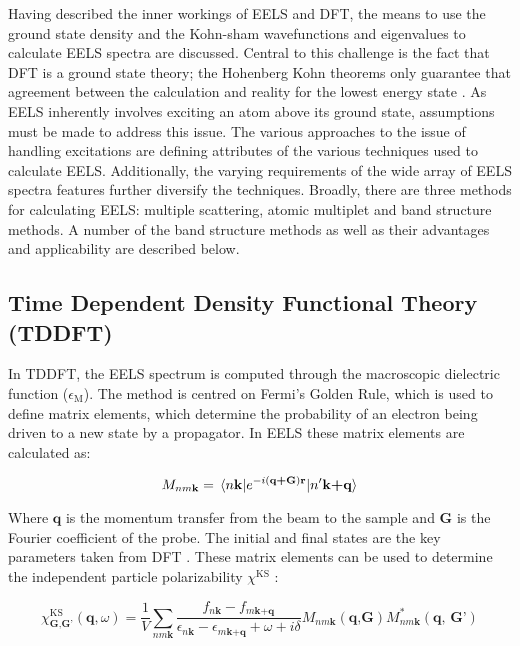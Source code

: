 
Having described the inner workings of EELS and DFT, the means to use the ground state density and the Kohn-sham wavefunctions and eigenvalues to calculate EELS spectra are discussed.  Central to this challenge is the fact that DFT is a ground state theory; the Hohenberg Kohn theorems only guarantee that agreement between the calculation and reality for the lowest energy state \cite{hohenberg_inhomogeneous_1964}. As EELS inherently involves exciting an atom above its ground state, assumptions must be made to address this issue. The various approaches to the issue of handling excitations are defining attributes of the various techniques used to calculate EELS.  Additionally, the varying requirements of the wide array of EELS spectra features further diversify the techniques. Broadly, there are three methods for calculating EELS: multiple scattering, atomic multiplet and band structure methods.  A number of the band structure methods as well as their advantages and applicability are described below.


\subsection{Time Dependent Density Functional Theory (TDDFT)}
In TDDFT, the EELS spectrum is computed through the macroscopic dielectric function ($\epsilon_{\mathrm{M}}$). The method is centred on Fermi's Golden Rule, which is used to define matrix elements, which determine the probability of an electron being driven to a new state by a propagator.  In EELS these matrix elements are calculated as:

\begin{equation}
M_{nm\textbf{k}} = \mel{n\textbf{k}}{e^{-i(\textbf{q+G})\textbf{r}}}{n'\textbf{k+q}}
\label{FGR}
\end{equation}

Where $\textbf{q}$ is the momentum transfer from the beam to the sample and \textbf{G} is the Fourier coefficient of the probe. The initial and final states are the key parameters taken from DFT \cite{exciting}.  These matrix elements can be used to determine the independent particle polarizability $\chi^{\mathrm{KS}}$ \cite{exciting}: 


\begin{equation}
\chi^{\mathrm{KS}}_{\mathrm{\textbf{G,G'}}}(\textbf{q},\omega)=\frac{1}{V}\sum_{nm\textbf{k}}\frac{f_{n\textbf{k}}-f_{m\textbf{k+q}}}{\epsilon_{n\textbf{k}}-\epsilon_{m\textbf{k+q}}+\omega + i\delta} M_{nm\textbf{k}}(\textbf{q,G})M^*_{nm\textbf{k}}(\textbf{q, G'})
\end{equation}

